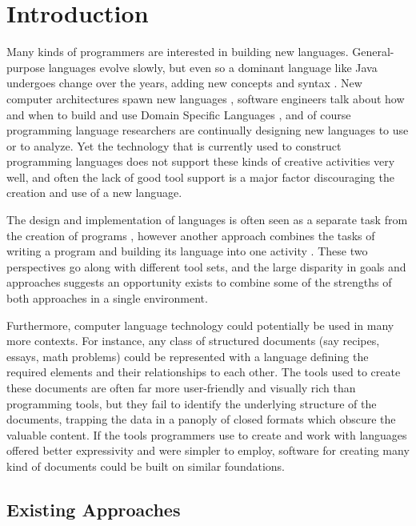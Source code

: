 \chapter{Introduction}


Many kinds of programmers are interested in building new languages. General-purpose languages evolve slowly, but even so a dominant language like Java undergoes change over the years, adding new concepts and syntax \cite{java-generics}. New computer architectures spawn new languages \cite{ctm}\cite{cuda}\cite{opencl}, software engineers talk about how and when to build and use Domain Specific Languages \cite{fowler}, and of course programming language researchers are continually designing new languages to use or to analyze. Yet the technology that is currently used to construct programming languages does not support these kinds of creative activities very well, and often the lack of good tool support is a major factor discouraging the creation and use of a new language.

The design and implementation of languages is often seen as a separate task from the creation of programs \cite{intentional}\cite{ward}, however another approach combines the tasks of writing a program and building its language into one activity \cite{on-lisp}. These two perspectives go along with different tool sets, and the large disparity in goals and approaches suggests an opportunity exists to combine some of the strengths of both approaches in a single environment.

Furthermore, computer language technology could potentially be used in many more contexts. For instance, any class of structured documents (say recipes, essays, math problems) could be represented with a language defining the required elements and their relationships to each other. The tools used to create these documents are often far more user-friendly and visually rich than programming tools, but they fail to identify the underlying structure of the documents, trapping the data in a panoply of closed formats which obscure the valuable content. If the tools programmers use to create and work with languages offered better expressivity and were simpler to employ, software for creating many kind of documents could be built on similar foundations. 

%
%
\section{Existing Approaches}

